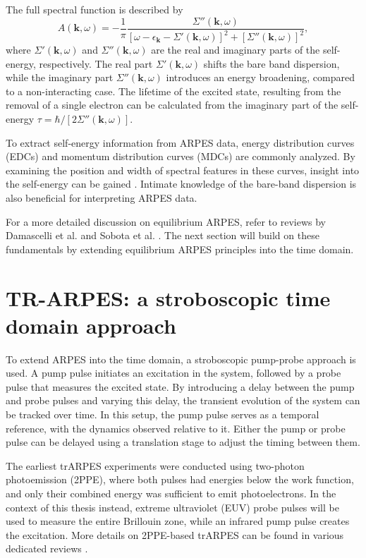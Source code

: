 The full spectral function is described by
\begin{equation} A(\mathbf{k}, \omega) = -\frac{1}{\pi} \frac{\Sigma''(\mathbf{k}, \omega)}{\left[ \omega - \epsilon_\mathbf{k} - \Sigma'(\mathbf{k}, \omega) \right]^2 + \left[ \Sigma''(\mathbf{k}, \omega) \right]^2},
\end{equation}
where $\Sigma'(\mathbf{k}, \omega)$ and $\Sigma''(\mathbf{k}, \omega)$ are the real and imaginary parts of the self-energy, respectively.
The real part $\Sigma'(\mathbf{k}, \omega)$ shifts the bare band dispersion, while the imaginary part $\Sigma''(\mathbf{k}, \omega)$ introduces an energy broadening, compared to a non-interacting case.
The lifetime of the excited state, resulting from the removal of a single electron can be calculated from the imaginary part of the self-energy $\tau=\hbar/\left[2\Sigma''(\mathbf{k}, \omega)\right]$.

To extract self-energy information from ARPES data, energy distribution curves (EDCs) and momentum distribution curves (MDCs) are commonly analyzed.
By examining the position and width of spectral features in these curves, insight into the self-energy can be gained \cite{norman_extraction_1999, freericks_what_2021,kurleto_about_2021}.
Intimate knowledge of the bare-band dispersion is also beneficial for interpreting ARPES data.

For a more detailed discussion on equilibrium ARPES, refer to reviews by Damascelli et al. and Sobota et al. \cite{damascelli_angle-resolved_2003,sobota_angle-resolved_2021}.
The next section will build on these fundamentals by extending equilibrium ARPES principles into the time domain.

\section{TR-ARPES: a stroboscopic time domain approach}

To extend ARPES into the time domain, a stroboscopic pump-probe approach is used.
A pump pulse initiates an excitation in the system, followed by a probe pulse that measures the excited state.
By introducing a delay between the pump and probe pulses and varying this delay, the transient evolution of the system can be tracked over time.
In this setup, the pump pulse serves as a temporal reference, with the dynamics observed relative to it.
Either the pump or probe pulse can be delayed using a translation stage to adjust the timing between them.

The earliest trARPES experiments were conducted using two-photon photoemission (2PPE), where both pulses had energies below the work function, and only their combined energy was sufficient to emit photoelectrons.
In the context of this thesis instead, extreme ultraviolet (EUV) probe pulses will be used to measure the entire Brillouin zone, while an infrared pump pulse creates the excitation.
More details on 2PPE-based trARPES can be found in various dedicated reviews \cite{damascelli_multiphoton_1996,bartoli_nonlinear_1997,hofer_time-resolved_1997,bovensiepen_elementary_2012,cui_transient_2014}.

